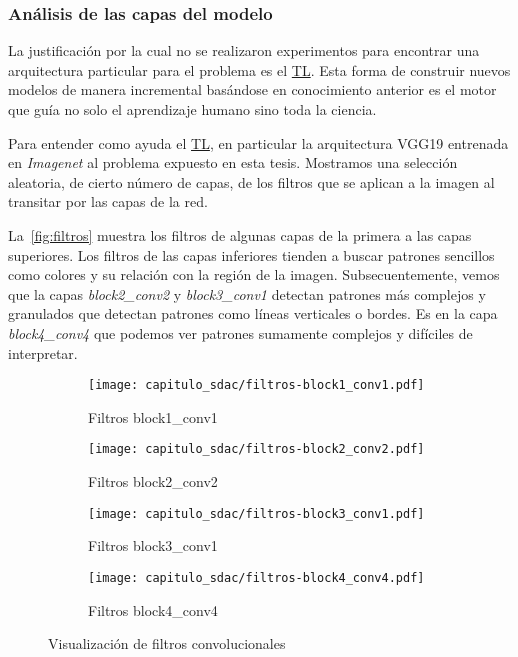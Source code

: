 \subsubsection{Análisis de las capas del modelo}

La justificación por la cual no se realizaron experimentos para encontrar una
arquitectura particular para el problema es el \hyperlink{abbr}{TL}. Esta forma de
construir nuevos modelos de manera incremental basándose en conocimiento
anterior es el motor que guía no solo el aprendizaje humano sino toda la
ciencia.

Para entender como ayuda el \hyperlink{abbr}{TL}, en particular la arquitectura
VGG19 entrenada en \emph{Imagenet} al problema expuesto en esta tesis. Mostramos
una selección aleatoria, de cierto número de capas, de los filtros que se
aplican a la imagen al transitar por las capas de la red. 

La~\autoref{fig:filtros} muestra los filtros de algunas capas de la primera a
las capas superiores. Los filtros de las capas inferiores tienden a buscar
patrones sencillos como colores y su relación con la región de la imagen.
Subsecuentemente, vemos que la capas \emph{block2\_conv2} y \emph{block3\_conv1}
detectan patrones más complejos y granulados que detectan patrones como líneas
verticales o bordes. Es en la capa \emph{block4\_conv4} que podemos ver patrones
sumamente complejos y difíciles de interpretar.

\begin{figure}[H] 
  \begin{subfigure}[b]{0.5\linewidth}
    \centering
    \texttt{[image: capitulo\_sdac/filtros-block1\_conv1.pdf]} 
    \caption{Filtros block1\_conv1}\label{fig7:aa}
    \vspace{4ex}
  \end{subfigure}%
  \begin{subfigure}[b]{0.5\linewidth}
    \centering
    \texttt{[image: capitulo\_sdac/filtros-block2\_conv2.pdf]} 
    \caption{Filtros block2\_conv2}\label{fig7:bb}
    \vspace{4ex}
  \end{subfigure} 
  \begin{subfigure}[b]{0.5\linewidth}
    \centering
    \texttt{[image: capitulo\_sdac/filtros-block3\_conv1.pdf]} 
    \caption{Filtros block3\_conv1}\label{fig7:cc}
  \end{subfigure}%
  \begin{subfigure}[b]{0.5\linewidth}
    \centering
    \texttt{[image: capitulo\_sdac/filtros-block4\_conv4.pdf]} 
    \caption{Filtros block4\_conv4}\label{fig7:dd}
  \end{subfigure} 
  \caption{Visualización de filtros convolucionales}\label{fig:filtros} 
\end{figure}

